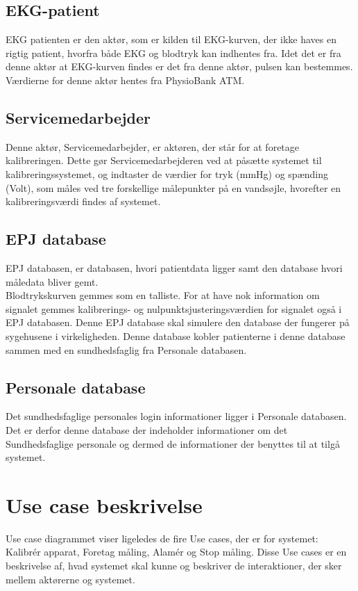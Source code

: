 \subsection{EKG-patient}
EKG patienten er den aktør, som er kilden til EKG-kurven, der ikke haves en rigtig patient, hvorfra både EKG og blodtryk kan indhentes fra. Idet det er fra denne aktør at EKG-kurven findes er det fra denne aktør, pulsen kan bestemmes.\\
Værdierne for denne aktør hentes fra PhysioBank ATM.
\subsection{Servicemedarbejder}
Denne aktør, Servicemedarbejder, er aktøren, der står for at foretage kalibreringen. Dette gør Servicemedarbejderen ved at påsætte systemet til kalibreringssystemet, og indtaster de værdier for tryk (mmHg) og spænding (Volt), som måles ved tre forskellige målepunkter på en vandsøjle, hvorefter en kalibreringsværdi findes af systemet.
\subsection{EPJ database}
EPJ databasen, er databasen, hvori patientdata ligger samt den database hvori måledata bliver gemt.\\
Blodtrykskurven gemmes som en talliste. For at have nok information om signalet gemmes kalibrerings- og nulpunktsjusteringsværdien for signalet også i EPJ databasen. Denne EPJ database skal simulere den database der fungerer på sygehusene i virkeligheden. Denne database kobler patienterne i denne database sammen med en sundhedsfaglig fra Personale databasen. 
\subsection{Personale database}
Det sundhedsfaglige personales login informationer ligger i Personale databasen. Det er derfor denne database der indeholder informationer om det Sundhedsfaglige personale og dermed de informationer der benyttes til at tilgå systemet.
\section{Use case beskrivelse}
Use case diagrammet viser ligeledes de fire Use cases, der er for systemet: Kalibrér apparat, Foretag måling, Alamér og Stop måling. Disse Use cases er en beskrivelse af, hvad systemet skal kunne og beskriver de interaktioner, der sker mellem aktørerne og systemet.
\\

